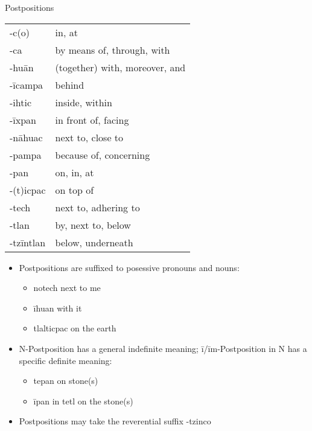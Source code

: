 \documentclass[12pt]{beamer}
\newcommand{\nah}[1]{\textcolor{nahgrn}{#1}}
\newcommand{\trs}[1]{\textcolor{nahblu}{#1}}
\begin{document}
\begin{frame}
\begin{columns}[t]
\begin{column}{.23\linewidth}
\begin{example}
			\end{example}
			\begin{block}{Postpositions}
				\begin{tabular}{ll}
					\nah{-c(o)}     & \trs{in, at}                         \\
					\nah{-ca}       & \trs{by means of, through, with}     \\
					\nah{-huān}     & \trs{(together) with, moreover, and} \\
					\nah{-īcampa}   & \trs{behind}                         \\
					\nah{-ihtic}    & \trs{inside, within}                 \\
					\nah{-īxpan}    & \trs{in front of, facing}            \\
					\nah{-nāhuac}   & \trs{next to, close to}              \\
					\nah{-pampa}    & \trs{because of, concerning}         \\
					\nah{-pan}      & \trs{on, in, at}                     \\
					\nah{-(t)icpac} & \trs{on top of}                      \\
					\nah{-tech}     & \trs{next to, adhering to}           \\
					\nah{-tlan}     & \trs{by, next to, below}             \\
					\nah{-tzīntlan} & \trs{below, underneath}              \\
				\end{tabular}%
				\begin{itemize}
					\item Postpositions are suffixed to posessive pronouns and nouns:
					\begin{itemize}
						\item \nah{notech} \trs{next to me}
						\item \nah{īhuan} \trs{with it}
						\item \nah{tlalticpac} \trs{on the earth}
					\end{itemize}
					\item N-Postposition has a general indefinite meaning; \nah{ī/īm}-Postposition \nah{in} N has a specific definite meaning:
					\begin{itemize}
						\item \nah{tepan} \trs{on stone(s)}
						\item \nah{īpan in tetl} \trs{on the stone(s)}
					\end{itemize}
					\item Postpositions may take the reverential suffix \nah{-tzinco}
				\end{itemize}
			\end{block}
		\end{column}
	\end{columns}
\end{frame}
\end{document}
